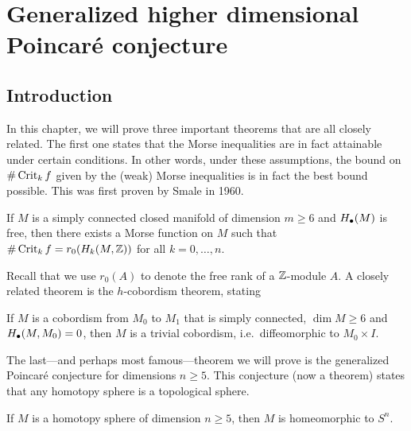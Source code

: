 \chapter[Generalized Poincaré conjecture]{Generalized higher dimensional Poincaré conjecture}
\label{chap:h-cobord}
\section{Introduction}

In this chapter, we will prove three important theorems that are all closely related.
The first one states that the Morse inequalities are in fact attainable under certain conditions.
In other words, under these assumptions, the bound on $\# \operatorname{Crit}_k f$ given by the (weak) Morse inequalities is in fact the best bound possible. This was first proven by Smale in 1960.
\begin{theorem}
    If $M$ is a simply connected closed manifold of dimension  $m \ge  6$ and $H_\bullet(M)$ is free, then there exists a Morse function on  $M$ such that  $\# \operatorname{Crit}_k f = r_0(H_k(M, \mathbb{Z}))$ for all $k = 0, \ldots, n$.
\end{theorem}
Recall that we use $r_0(A)$ to denote the free rank of a $\mathbb{Z}$-module $A$.
A closely related theorem is the $h$-cobordism theorem, stating
\begin{theorem}
    If $M$ is a cobordism from $M_0$ to $M_1$ that is simply connected, $\dim M \ge 6$ and $H_{\bullet}(M,M_0) = 0$, then $M$ is a trivial cobordism, i.e.\ diffeomorphic to  $ M_0 \times I$.
\end{theorem}
The last---and perhaps most famous---theorem we will prove is the generalized Poincaré conjecture for dimensions $n \ge 5$.
This conjecture (now a theorem) states that any homotopy sphere is a topological sphere.
\begin{theorem}
    If $M$ is a homotopy sphere of dimension  $n \ge 5$, then $M$ is homeomorphic to  $S^{n}$.
\end{theorem}

